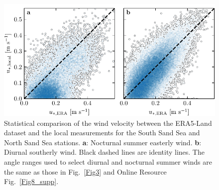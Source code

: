 \begin{figure}[p]
\centering
\includegraphics[scale=1]{Figures/Figure10_supp.pdf}
\caption{Statistical comparison of the wind velocity between the ERA5-Land dataset and the local measurements for the South Sand Sea and North Sand Sea stations. \textbf{a}: Nocturnal summer easterly wind. \textbf{b}: Diurnal southerly wind. Black dashed lines are identity lines. The angle ranges used to select diurnal and nocturnal summer winds are the same as those in Fig.~\ref{Fig3} and Online Resource Fig.~\ref{Fig8_supp}.}
\label{Fig10_supp}
\end{figure}

